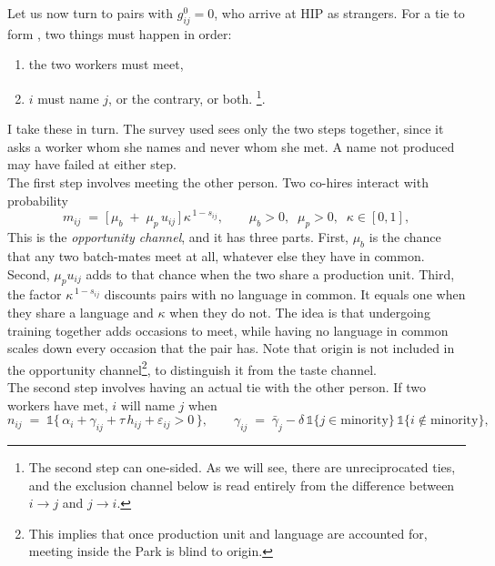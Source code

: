 
\noindent Let us now turn to pairs with $g^0_{ij}=0$, who arrive at HIP as strangers. For a tie to form , two things must happen in order:
\begin{enumerate}
    \item the two workers must meet,
    \item $i$ must name $j$, or the contrary, or both. \footnote{The second step can one-sided. As we will see, there are unreciprocated ties, and the exclusion channel below is read entirely from the difference between $i \to j$ and $j \to i$.}.
\end{enumerate}
\noindent I take these in turn. The survey used sees only the two steps together, since it asks a worker whom she names and never whom she met. A name
not produced may have failed at either step. \\

\noindent The first step involves meeting the other person. Two co-hires interact with probability
\begin{equation}
\label{eq:model-meet}
m_{ij} \;=\; \big[\, \mu_b \;+\; \mu_p\, u_{ij} \,\big]\, \kappa^{\,1-s_{ij}},
\qquad \mu_b > 0,\;\; \mu_p > 0,\;\; \kappa \in [0,1],
\end{equation}
This is the \textit{opportunity channel}, and it has three parts. First,
$\mu_b$ is the chance that any two batch-mates meet at all, whatever else
they have in common. Second, $\mu_p u_{ij}$ adds to that chance when the
two share a production unit. Third, the factor $\kappa^{\,1-s_{ij}}$ discounts pairs with no language in common. It equals one when they share a language and $\kappa$ when they do not. The idea is that undergoing training together adds occasions to meet, while having no language in common scales down every occasion that the pair has. Note that origin is not included in the opportunity channel\footnote{This implies that once
production unit and language are accounted for, meeting inside the Park is
blind to origin.}, to distinguish it from the taste channel.  \\

\noindent The second step involves having an actual tie with the other person.  If two workers have met, $i$ will name $j$ when
\begin{equation}
\label{eq:model-name}
n_{ij} \;=\; \mathds{1}\big\{\, \alpha_i + \gamma_{ij} + \tau\, h_{ij} + \varepsilon_{ij} > 0 \,\big\},
\qquad
\gamma_{ij} \;=\; \bar{\gamma}_j - \delta\, \mathds{1}\{j \in \text{minority}\}\,\mathds{1}\{i \notin \text{minority}\},
\end{equation}

